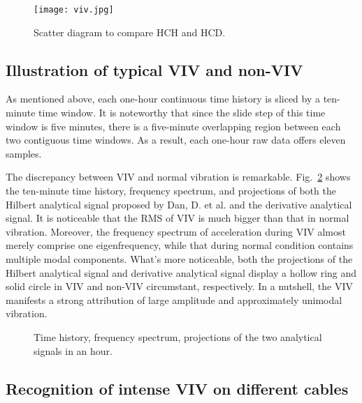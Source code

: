 \documentclass[preprint, 3p, times, compress, 11pt]{elsarticle}
\begin{document}
\begin{figure}[ht]
    \centering
    \texttt{[image: viv.jpg]}
    \caption{Scatter diagram to compare HCH and HCD.}
    \label{fig:HCH_HCD}
\end{figure}

\subsection{Illustration of typical VIV and non-VIV} 

As mentioned above, each one-hour continuous time history is sliced by 
a ten-minute time window. It is noteworthy that since the slide step of 
this time window is five minutes, there is a five-minute overlapping 
region between each two contiguous time windows. As a result, each 
one-hour raw data offers eleven samples.

The discrepancy between VIV and normal vibration is remarkable. 
Fig.~\ref{fig:time_freq_hilb_deri} shows the ten-minute time history, 
frequency spectrum, and projections of both the Hilbert analytical signal 
proposed by Dan, D. et al. \cite{dan2022monitoring} and the 
derivative analytical signal. It is noticeable that the RMS of VIV is 
much bigger than that in normal vibration. Moreover, the frequency 
spectrum of acceleration during VIV almost merely comprise one 
eigenfrequency, while that during normal condition contains multiple 
modal components. What's more noticeable, both the projections of the 
Hilbert analytical signal and derivative analytical signal display a 
hollow ring and solid circle in VIV and non-VIV circumstant, 
respectively. In a nutshell, the VIV manifests a strong attribution 
of large amplitude and approximately unimodal vibration.

\begin{figure}[ht]
    \centering
    \qquad
    \caption{Time history, frequency spectrum, projections of the two 
            analytical signals in an hour.}
    \label{fig:time_freq_hilb_deri}
\end{figure}

\subsection{Recognition of intense VIV on different cables}
\end{document}
